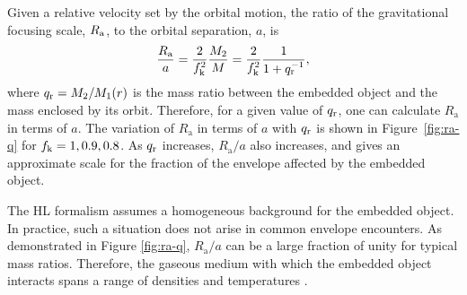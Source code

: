 Given a relative velocity set by the orbital motion, the ratio of the gravitational focusing scale, $R_{\rm a}$, to the orbital separation, $a$, is \cite{MacLeod:2017}
\begin{equation}
\frac{R_{\mathrm a}}{a} = \frac{2}{f_{\rm k}^{2}}\frac{M_{2}}{M} = \frac{2}{f_{\rm k}^{2}}\frac{1}{1 + q_{\rm r}^{-1}},\label{eq:Ra_asfunc_a}
\end{equation}
where $q_{\rm r}=M_{2}/M_{1}(r)$ is the mass ratio between the embedded object and the mass enclosed by its orbit. Therefore, for a given value of $q_{\rm r}$, one can calculate $R_{\mathrm a}$ in terms of $a$. The variation of $R_{\mathrm a}$ in terms of $a$ with $q_{\rm r}$ is shown in Figure~\ref{fig:ra-q} for $f_{\rm k}=1, 0.9, 0.8$. As $q_{\rm r}$ increases, $R_{\mathrm a}/a$ also increases, and gives an approximate scale for the fraction of the envelope affected by the embedded object.

The HL formalism assumes a homogeneous background for the embedded object. In practice, such a situation does not arise in common envelope encounters. As demonstrated in Figure \ref{fig:ra-q},  $R_{\mathrm{a}}/a$ can be a large fraction of unity for typical mass ratios. Therefore, the gaseous medium with which the embedded object interacts spans a range of densities and temperatures \cite{MacLeod_2015}. 

